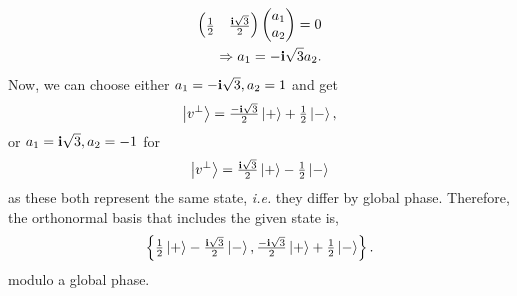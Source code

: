 \begin{enumerate}[label=\alph*.,ref={Sol.~\thesection\alph*}]
\begin{align*}
        \begin{pmatrix} \tfrac{1}{2} & \tfrac{\mathbf{i} \sqrt{3}}{2} \end{pmatrix} \begin{pmatrix} a_1 \\ a_2 \end{pmatrix} = 0 \\
        \Rightarrow a_1 = - \mathbf{i} \sqrt{3} a_2.
    \end{align*}
    Now, we can choose either $a_1 = - \mathbf{i} \sqrt{3}, a_2 = 1$ and get
    \begin{align*}
        \ket{v^\perp} = \tfrac{- \mathbf{i} \sqrt{3}}{2} \ket{+} + {\tfrac{1}{2}} \ket{-},
    \end{align*}
    or $a_1 = \mathbf{i} \sqrt{3}, a_2 = -1$ for
    \begin{align*}
        \ket{v^\perp} = \tfrac{\mathbf{i} \sqrt{3}}{2} \ket{+} - {\tfrac{1}{2}} \ket{-}
    \end{align*}
    as these both represent the same state, \textit{i.e.} they differ by global phase.
    Therefore, the orthonormal basis that includes the given state is,
    \begin{align*}
         \left \{ \tfrac{1}{2} \ket{+} - \tfrac{\mathbf{i} \sqrt{3}}{2} \ket{-}, \tfrac{- \mathbf{i} \sqrt{3}}{2} \ket{+} + {\tfrac{1}{2}} \ket{-} \right \}.
    \end{align*}
    modulo a global phase.
\end{enumerate}
